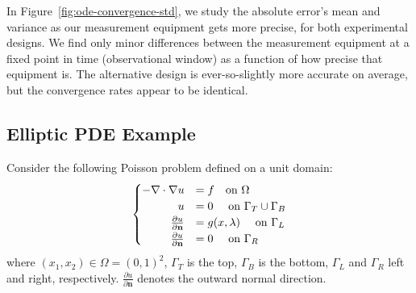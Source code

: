 In Figure~\ref{fig:ode-convergence-std}, we study the absolute error's mean and variance as our measurement equipment gets more precise, for both experimental designs.
We find only minor differences between the measurement equipment at a fixed point in time (observational window) as a function of how precise that equipment is.
The alternative design is ever-so-slightly more accurate on average, but the convergence rates appear to be identical.



\FloatBarrier
\subsection{Elliptic PDE Example}\label{subsec:pde-example}

Consider the following Poisson problem defined on a unit domain:
\begin{equation}\label{eq:pde-equation}
\begin{cases}
\hfill -\nabla \cdot \nabla u &= f \quad\text{on } \Omega \\
\hfill u &= 0 \quad\text{ on } \Gamma_T \cup \Gamma_B \\
\hfill \frac{\partial u}{\partial \mathbf{n}} &= g(x,\param) \quad\text{ on } \Gamma_L \\
\hfill \frac{\partial u}{\partial \mathbf{n}} &= 0 \quad\text{ on } \Gamma_R
\end{cases}
\end{equation}
where $(x_1, x_2) \in \Omega = (0,1)^2$, $\Gamma_T$ is the top, $\Gamma_B$ is the bottom, $\Gamma_L$ and $\Gamma_R$ left and right, respectively.
$\frac{\partial u}{\partial \mathbf{n}}$ denotes the outward normal direction.

